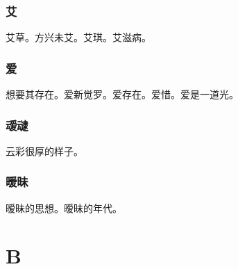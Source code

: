 \documentclass[UTF8]{oneHumanIndex}
\begin{document}
\subsection{艾}
艾草。方兴未艾。艾琪。艾滋病。

\subsection{爱}
想要其存在。爱新觉罗。爱存在。爱惜。爱是一道光。

\subsection{叆叇}
云彩很厚的样子。

\subsection{暧昧}
暧昧的思想。暧昧的年代。

\chapter{B}
\end{document}
